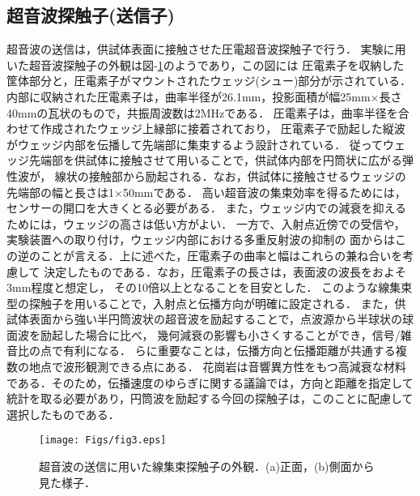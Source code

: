 \subsection{超音波探触子(送信子)}
超音波の送信は，供試体表面に接触させた圧電超音波探触子で行う．
実験に用いた超音波探触子の外観は図-\ref{fig:fig2}のようであり，この図には
圧電素子を収納した筐体部分と，圧電素子がマウントされたウェッジ(シュー)部分が示されている．
内部に収納された圧電素子は，曲率半径が26.1mm，投影面積が幅25mm×長さ40mmの瓦状のもので，共振周波数は2MHzである．
圧電素子は，曲率半径を合わせて作成されたウェッジ上縁部に接着されており，
圧電素子で励起した縦波がウェッジ内部を伝播して先端部に集束するよう設計されている．
従ってウェッジ先端部を供試体に接触させて用いることで，供試体内部を円筒状に広がる弾性波が，
線状の接触部から励起される．なお，供試体に接触させるウェッジの先端部の幅と長さは1×50mmである．
%
高い超音波の集束効率を得るためには，センサーの開口を大きくとる必要がある．
また，ウェッジ内での減衰を抑えるためには，ウェッジの高さは低い方がよい．
一方で、入射点近傍での受信や，実験装置への取り付け，ウェッジ内部における多重反射波の抑制の
面からはこの逆のことが言える．上に述べた，圧電素子の曲率と幅はこれらの兼ね合いを考慮して
決定したものである．なお，圧電素子の長さは，表面波の波長をおよそ3mm程度と想定し，
その10倍以上となることを目安とした．
%
このような線集束型の探触子を用いることで，入射点と伝播方向が明確に設定される．
また，供試体表面から強い半円筒波状の超音波を励起することで，点波源から半球状の球面波を励起した場合に比べ，
幾何減衰の影響も小さくすることができ，信号/雑音比の点で有利になる．
%
らに重要なことは，伝播方向と伝播距離が共通する複数の地点で波形観測できる点にある．
花崗岩は音響異方性をもつ高減衰な材料である．そのため，伝播速度のゆらぎに関する議論では，方向と距離を指定して統計を取る必要があり，円筒波を励起する今回の探触子は，このことに配慮して選択したものである．
\begin{figure}[h]
\begin{center}
\texttt{[image: Figs/fig3.eps]}
\caption{
	超音波の送信に用いた線集束探触子の外観．(a)正面，(b)側面から見た様子．
}
\label{fig:fig2}
\end{center}
\end{figure}
